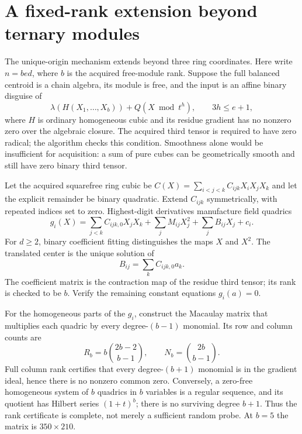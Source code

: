 \section{A fixed-rank extension beyond ternary modules}\label{sec:rankfive}
The unique-origin mechanism extends beyond three ring coordinates.
Here write $n=bed$, where $b$ is the acquired free-module rank.
Suppose the full balanced centroid is a chain algebra, its module is free,
and the input is an affine binary disguise of
\[
 \lambda(H(X_1,\ldots,X_b))+Q(X\bmod t^h),\qquad 3h\le e+1,
\]
where $H$ is ordinary homogeneous cubic and its residue gradient has no
nonzero zero over the algebraic closure. The acquired third tensor is
required to have zero radical; the algorithm checks this condition.
Smoothness alone would be insufficient for acquisition: a sum of pure
cubes can be geometrically smooth and still have zero binary third tensor.

Let the acquired squarefree ring cubic be
$C(X)=\sum_{i<j<k}C_{ijk}X_iX_jX_k$ and let the explicit remainder be
binary quadratic. Extend $C_{ijk}$ symmetrically, with repeated indices
set to zero. Highest-digit derivatives manufacture field quadrics
\[
 g_i(X)=\sum_{j<k}C_{ijk,0}X_jX_k+
        \sum_jM_{ij}X_j^2+\sum_jB_{ij}X_j+c_i.
\]
For $d\ge2$, binary coefficient fitting distinguishes the maps $X$ and
$X^2$. The translated center is the unique solution of
\[
 B_{ij}=\sum_k C_{ijk,0}a_k.
\]
The coefficient matrix is the contraction map of the residue third tensor;
its rank is checked to be $b$. Verify the remaining constant equations
$g_i(a)=0$.

For the homogeneous parts of the $g_i$, construct the Macaulay matrix
that multiplies each quadric by every degree-$(b-1)$ monomial. Its row
and column counts are
\[
 R_b=b\binom{2b-2}{b-1},\qquad N_b=\binom{2b}{b-1}.
\]
Full column rank certifies that every degree-$(b+1)$ monomial is in the
gradient ideal, hence there is no nonzero common zero. Conversely,
a zero-free homogeneous system of $b$ quadrics in $b$ variables is a
regular sequence, and its quotient has Hilbert series $(1+t)^b$;
there is no surviving degree $b+1$. Thus the rank certificate is complete,
not merely a sufficient random probe. At $b=5$ the matrix is $350\times210$.

